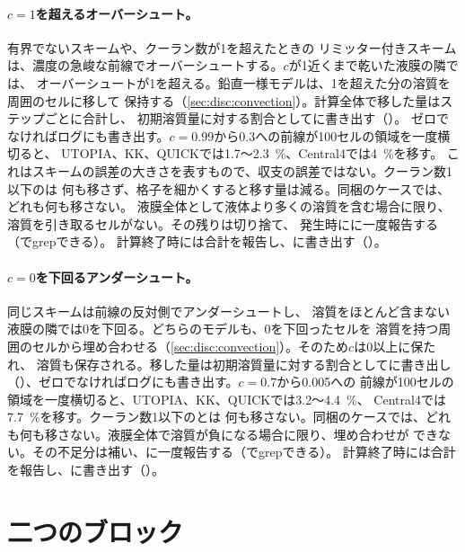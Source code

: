 \paragraph{$c = 1$を超えるオーバーシュート。} 有界でないスキームや、クーラン数が1を超えたときの
リミッター付きスキームは、濃度の急峻な前線でオーバーシュートする。$c$が1近くまで乾いた液膜の隣では、
オーバーシュートが1を超える。鉛直一様モデルは、1を超えた分の溶質を周囲のセルに移して
保持する（\cref{sec:disc:convection}）。計算全体で移した量はステップごとに合計し、
初期溶質量に対する割合としてに書き出す（）。
ゼロでなければログにも書き出す。$c = 0.99$から0.3への前線が100セルの領域を一度横切ると、
UTOPIA、KK、QUICKでは1.7〜\SI{2.3}{\percent}、Central4では\SI{4}{\percent}を移す。
これはスキームの誤差の大きさを表すもので、収支の誤差ではない。クーラン数1以下のは
何も移さず、格子を細かくすると移す量は減る。同梱のケースでは、どれも何も移さない。
液膜全体として液体より多くの溶質を含む場合に限り、溶質を引き取るセルがない。その残りは切り捨て、
発生時にに一度報告する（でgrepできる）。
計算終了時には合計を報告し、に書き出す（）。

\paragraph{$c = 0$を下回るアンダーシュート。} 同じスキームは前線の反対側でアンダーシュートし、
溶質をほとんど含まない液膜の隣では0を下回る。どちらのモデルも、0を下回ったセルを
溶質を持つ周囲のセルから埋め合わせる（\cref{sec:disc:convection}）。そのため$c$は0以上に保たれ、
溶質も保存される。移した量は初期溶質量に対する割合としてに書き出し
（）、ゼロでなければログにも書き出す。$c = 0.7$から0.005への
前線が100セルの領域を一度横切ると、UTOPIA、KK、QUICKでは3.2〜\SI{4.4}{\percent}、
Central4では\SI{7.7}{\percent}を移す。クーラン数1以下のとは
何も移さない。同梱のケースでは、どれも何も移さない。液膜全体で溶質が負になる場合に限り、埋め合わせが
できない。その不足分は補い、に一度報告する（でgrepできる）。
計算終了時には合計を報告し、に書き出す（）。

\section{二つのブロック}
\label{sec:ref-numerics:linearsolver}

